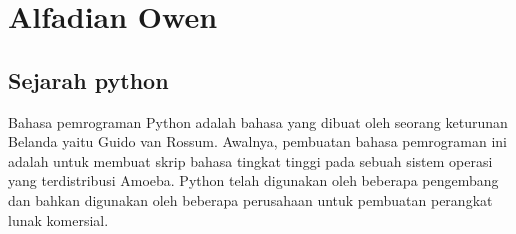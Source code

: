 \section{Alfadian Owen}



 
 
\subsection{Sejarah python}


\qquad Bahasa pemrograman Python adalah bahasa yang dibuat oleh seorang keturunan Belanda yaitu Guido van Rossum. Awalnya, pembuatan bahasa pemrograman ini adalah untuk membuat skrip bahasa tingkat tinggi pada sebuah sistem operasi yang terdistribusi Amoeba. Python telah digunakan oleh beberapa pengembang dan bahkan digunakan oleh beberapa perusahaan untuk pembuatan perangkat lunak komersial.



